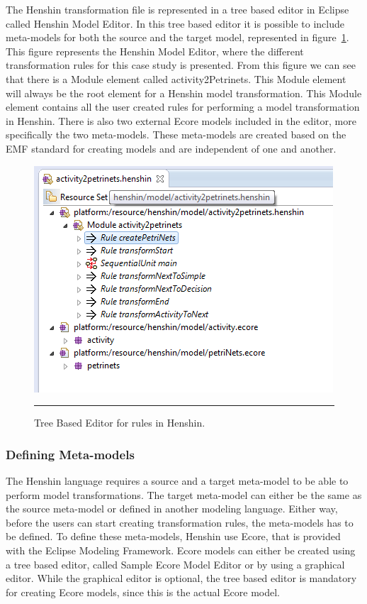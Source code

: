 The Henshin transformation file is represented in a tree based editor in
Eclipse called Henshin Model Editor. In this tree based editor it is possible
to include meta-models for both the source and the target model, represented in
figure~\ref{fig:Henshin_TreeEditor}. This figure represents the Henshin
Model Editor, where the different transformation rules for this case study is
presented. From this figure we can see that there is a Module element called
activity2Petrinets. This Module element will always be the root element for a
Henshin model transformation. This Module element contains all the user created
rules for performing a model transformation in Henshin. There is also two
external Ecore models included in the editor, more specifically the two
meta-models. These meta-models are created based on the EMF standard for creating
models and are independent of one and another.

\begin{figure}[H]
	\centering
	\includegraphics[scale=0.7]{figures/Henshin_TreeEdtiro.png}
	\rule{35em}{0.5pt}
	\caption[The Henshin Model Editor]
	{Tree Based Editor for rules in Henshin.}
	\label{fig:Henshin_TreeEditor}
\end{figure}

\subsubsection*{Defining Meta-models}

The Henshin language requires a source and a target meta-model to be able to
perform model transformations. The target meta-model can either be the same as
the source meta-model or defined in another modeling language. Either way, before
the users can start creating transformation rules, the meta-models has
to be defined. To define these meta-models, Henshin use Ecore, that is
provided with the Eclipse Modeling Framework\cite{Steinberg2009}. Ecore models
can either be created using a tree based editor, called Sample Ecore Model
Editor or by using a graphical editor. While the graphical editor is optional,
the tree based editor is mandatory for creating Ecore models, since this is the
actual Ecore model. 

